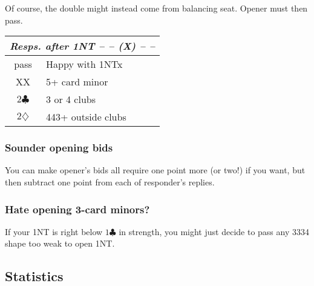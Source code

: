 \documentclass[a4paper, twoside, 11pt]{article}
\begin{document}
\begin{multicols}{3}
\begin{center}
\begin{tabular}{ |c|l| }
 \hline
\end{tabular}
\end{center}

Of course, the double might instead come from balancing seat. Opener must then pass.

\begin{center}
\begin{tabular}{ |c|l| }
 \hline
 \multicolumn{2}{|c|}{\textit{Resps. after \textnormal{1NT} -- -- (X) -- --}} \\
 \hline
 pass & Happy with \textnormal{1NT}x \\
 XX & 5+ card minor \\
 $2\clubsuit$ & 3 or 4 clubs \\
 $2\diamondsuit$ &  443+ outside clubs \\
 \hline
\end{tabular}
\end{center}


\subsubsection*{Sounder opening bids}
You can make opener's bids all require one point more (or two!) if you want, but then subtract one point from each of responder's replies.

\subsubsection*{Hate opening 3-card minors?}
If your \textnormal{1NT} is right below $1\clubsuit$ in strength, you might just decide to pass any 3334 shape too weak to open \textnormal{1NT}.
\subsection*{Statistics}


\end{multicols}
\end{document}
